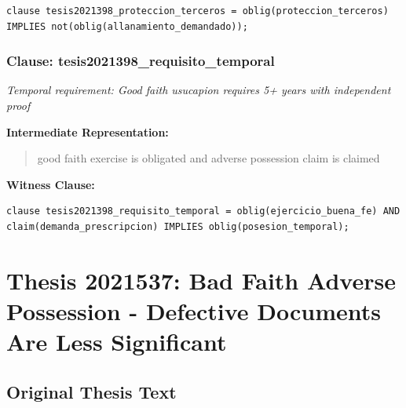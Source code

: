 \documentclass[11pt,a4paper]{article}
\begin{document}
\begin{lstlisting}[style=witnessstyle, language=Witness]
clause tesis2021398_proteccion_terceros = oblig(proteccion_terceros) IMPLIES not(oblig(allanamiento_demandado));
\end{lstlisting}

\subsubsection{Clause: tesis2021398\_requisito\_temporal}

\textit{Temporal requirement: Good faith usucapion requires 5+ years with independent proof}

\textbf{Intermediate Representation:}

\begin{quote}
good faith exercise is obligated and adverse possession claim is claimed
\end{quote}

\textbf{Witness Clause:}

\begin{lstlisting}[style=witnessstyle, language=Witness]
clause tesis2021398_requisito_temporal = oblig(ejercicio_buena_fe) AND claim(demanda_prescripcion) IMPLIES oblig(posesion_temporal);
\end{lstlisting}

\newpage

\section{Thesis 2021537: Bad Faith Adverse Possession - Defective Documents Are Less Significant}
\label{thesis:2021537}

\subsection{Original Thesis Text}
\end{document}
